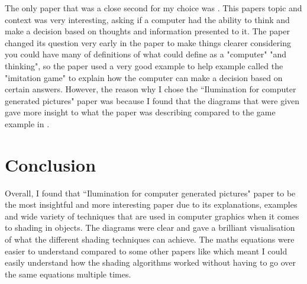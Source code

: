 \documentclass{scrartcl}
\begin{document}
	The only paper that was a close second for my choice was \cite{four}. This papers topic and context was very interesting, asking if a computer had the ability to think and make a decision based on thoughts and information presented to it. The paper changed its question very early in the paper to make things clearer considering you could have many of definitions of what could define as a "computer" "and thinking", so the paper used a very good example to help example called the "imitation game" to explain how the computer can make a decision based on certain answers. However, the reason why I chose the “Ilumination for computer generated pictures" paper was because I found that the diagrams that were given gave more insight to what the paper was describing compared to the game example in \cite{four}.\\
	      
	\section{Conclusion}
	
Overall, I found that “Ilumination for computer generated pictures" paper to be the most insightful and more interesting paper due to its explanations, examples and wide variety of techniques that are used in computer graphics when it comes to shading in objects. The diagrams were clear and gave a brilliant visualisation of what the different shading techniques can achieve. The maths equations were easier to understand compared to some other papers like \cite{two} \cite{three} which meant I could easily understand how the shading algorithms worked without having to go over the same equations multiple times.
  
	
	

		
	
\end{document}
